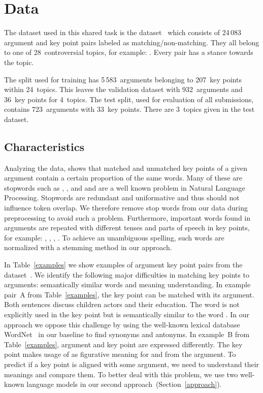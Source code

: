 \section{Data}\label{data}

The dataset used in this shared task is the \ArgKP dataset~\cite{Bar-HaimEFKLS2020} which consists of 24\,083 argument 
and key point pairs labeled as matching/non-matching. They all belong to one of 28~controversial topics, for example: 
. Every pair has a stance towards the topic. 

The split used for training has 5\,583~arguments belonging to 207~key points within 24~topics. This leaves the 
validation dataset with 932~arguments and 36~key points for 4~topics. The test split, used for evaluation of 
all submissions, contains 723~arguments with 33~key points. There are 3~topics given in the test dataset.

\subsection{Characteristics}


Analyzing the data, shows that matched and unmatched key points of a given argument contain a certain proportion of the same words. 
Many of these are stopwords such as , , and  and are a well known problem 
in Natural Language Processing.
Stopwords are redundant and uniformative and thus should not influence token overlap.
We therefore remove stop words from our data during preprocessing to avoid such a problem. 
Furthermore, important words found in arguments are repeated with different tenses and parts of speech in key points, for example: 
, , , . 
To achieve an unambiguous spelling, such words are normalized with a stemming method in our approach. 

In Table~\ref{examples} we show examples of argument key point pairs from the \ArgKP dataset~\cite{Bar-HaimEFKLS2020}. 
We identify the following major difficulties in matching key points to arguments: semantically similar words and meaning 
understanding.
In example pair~A from Table~\ref{examples}, the key point can be matched with its argument. Both sentences discuss 
children actors and their education. The word  is not explicitly used in the key point but is 
semantically similar to the word . 
In our approach we oppose this challenge by using the well-known lexical database WordNet~\cite{Miller1995} in our 
baseline to find synonyms and antonyms.
In example~B from Table~\ref{examples}, argument and key point are expressed differently. 
The key point makes usage of  as figurative meaning for  and  from the argument. 
To predict if a key point is aligned with some argument, we need to understand their meanings and compare them. 
To better deal with this problem, we use two well-known language models in our second approach~(Section~\ref{approach}). 

